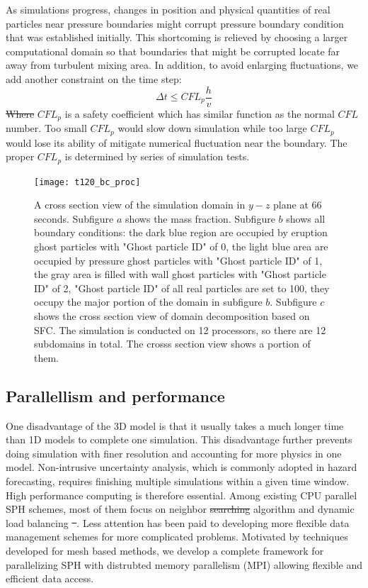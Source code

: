 \documentclass[gmd, manuscript]{copernicus} %
\providecommand{\DIFadd}[1]{{\protect\color{blue}\uwave{#1}}} %
\providecommand{\DIFdel}[1]{{\protect\color{red}\sout{#1}}}                      %
\providecommand{\DIFaddbegin}{} %
\providecommand{\DIFaddend}{} %
\providecommand{\DIFdelbegin}{} %
\providecommand{\DIFdelend}{} %
\begin{document}
As simulations progress, changes in position and physical quantities of real particles near pressure boundaries might corrupt pressure boundary condition that was established initially. This shortcoming is relieved by choosing a larger computational domain so that boundaries that might be corrupted locate far away from turbulent mixing area. In addition, to avoid enlarging fluctuations, we add another constraint on the time step: 
\begin{equation}
\Delta t \leq CFL_p \dfrac{h}{v}
\end{equation}
\DIFdelbegin \DIFdel{Where }\DIFdelend \DIFaddbegin \DIFadd{where }\DIFaddend $CFL_p$ is a safety coefficient which has similar function as the normal $CFL$ number. Too small $CFL_p$ would slow down simulation while too large $CFL_p$ would lose its ability of mitigate numerical fluctuation near the boundary. The proper $CFL_p$ is determined by \DIFaddbegin \DIFadd{a }\DIFaddend series of simulation tests.

\begin{figure}
\texttt{[image: t120\_bc\_proc]}
\caption{A cross section view of the simulation domain in $y-z$ plane at 66 seconds. Subfigure $a$ shows the mass fraction. Subfigure $b$ shows all boundary conditions: the dark blue region are occupied by eruption ghost particles with "Ghost particle ID" of 0, the light blue area are occupied by pressure ghost particles with "Ghost particle ID" of 1, the gray area is filled with wall ghost particles with "Ghost particle ID" of 2, "Ghost particle ID" of all real particles are set to 100, they occupy the major portion of the domain in subfigure $b$. Subfigure $c$ shows the cross section view of domain decomposition based on SFC. The simulation is conducted on 12 processors, so there are 12 subdomains in total. The crosss section view shows a portion of them.}
\label{fig:bc_and_domain_decomp}
\end{figure}

\subsection{Parallellism and performance}
One disadvantage of the 3D model is that it usually takes a much longer time than 1D models to complete one simulation. This disadvantage further prevents doing simulation with finer resolution and accounting for more physics in one model. Non-intrusive uncertainty analysis, which is commonly adopted in hazard forecasting, requires finishing multiple simulations within a given time window. High performance computing is therefore essential. Among existing CPU parallel SPH schemes, most of them focus on neighbor \DIFdelbegin \DIFdel{searching }\DIFdelend \DIFaddbegin \DIFadd{search }\DIFaddend algorithm and dynamic load balancing \DIFdelbegin \DIFdel{\mbox{ \citep[eg. ][]{ferrari2009new, crespo2015dualsphysics}}}\DIFdelend \DIFaddbegin \DIFadd{\mbox{ \citep {ferrari2009new, crespo2015dualsphysics} } }\DIFaddend . Less attention has been paid to developing more flexible data management schemes for more complicated problems. Motivated by techniques developed for mesh based methods, we develop a complete framework for parallelizing SPH with distrubted memory parallelism (MPI) allowing flexible and efficient data access.
\end{document}
